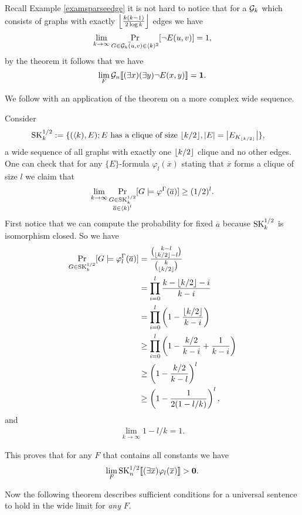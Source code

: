 \begin{exam}
Recall Example \ref{examsparseedge} it is not hard to notice that for a $\mathcal{G}_k$ which consists of graphs with exactly $\left \lfloor {\frac{k(k-1)}{2\log k}} \right \rfloor$ edges we have
\[\lim_{k\to\infty}\Pr_{\substack{G\in \mathcal{G}_k}\\\overline (u,v) \in \langle k)^2}[\lnot E(u,v)]=1,\]
by the theorem it follows that we have
\[\lim_{F}\mathcal{G}_n\llbracket(\exists x)(\exists y)\lnot E(x,y)\rrbracket=\textbf{1}.\]
\end{exam}

We follow with an application of the theorem on a more complex wide sequence.

\begin{exam}\label{examskhalf}
Consider
\begin{align*}
\text{SK}_k^{1/2}&:=\{(\langle k),E);\text{$E$ has a clique of size $\left \lfloor {k/2} \right \rfloor$}, \left|{E}\right|=\left|{E_{K_{\left \lfloor {k/2} \right \rfloor}}}\right|\},
\end{align*}
a wide sequence of all graphs with exactly one $\left \lfloor {k/2} \right \rfloor$ clique and no other edges. One can check that for any $\{E\}$-formula $\varphi_l(\overline x)$ stating that $\overline x$ forms a clique of size $l$ we claim that 
\[\lim_{k\to\infty} \Pr_{\substack{G\in\text{SK}_k^{1/2}\\\overline a \in \langle k)^l}}[G\models \varphi^\Gamma(\overline a)]\geq(1/2)^l.\]
First notice that we can compute the probability for fixed $\overline a$ because $\text{SK}_k^{1/2}$ is isomorphism closed. So we have
\begin{align}
\Pr_{G\in\text{SK}_k^{1/2}}[G\models \varphi_l^\Gamma(\overline a)]&=\frac{\binom{k-l}{\left \lfloor {k/2} \right \rfloor-l}}{\binom{k}{\left \lfloor {k/2} \right \rfloor}}\\
&=\prod_{i=0}^l\frac{k-\left \lfloor {k/2} \right \rfloor-i}{k-i}\\
&=\prod_{i=0}^l\left(1-\frac{\left \lfloor {k/2} \right \rfloor}{k-i}\right)\\
&\geq\prod_{i=0}^l\left(1-\frac{k/2}{k-i}+\frac{1}{k-i}\right)\\
&\geq\left(1-\frac{k/2}{k-l}\right)^l\\
&\geq\left(1-\frac{1}{2(1-l/k)}\right)^l,
\end{align}
and
\begin{align}
\lim_{k\to\infty}1-l/k=1.
\end{align}

This proves that for any $F$ that contains all constants we have
\[\lim_{F}\text{SK}_{n}^{1/2}\llbracket(\exists \overline x)\varphi_l(\overline x)\rrbracket>\textbf{0}.\]
\end{exam}

Now the following theorem describes sufficient conditions for a universal sentence to hold in the wide limit for \textit{any} $F$.

